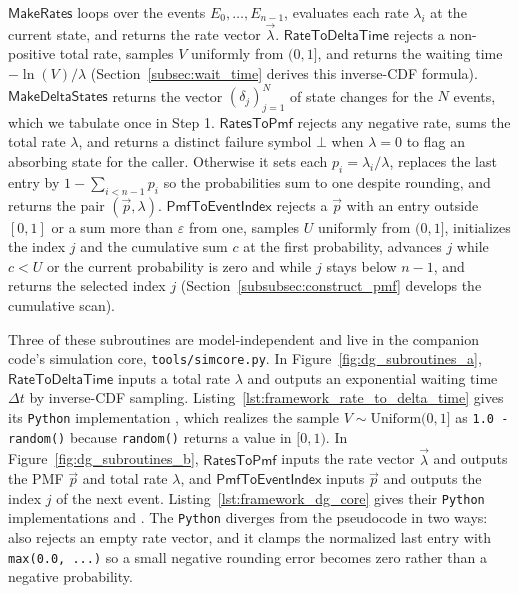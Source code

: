 $\textsf{MakeRates}$ loops over the events $E_0, \ldots, E_{n-1}$, evaluates each rate $\lambda_i$ at the current state, and returns the rate vector $\vec{\lambda}$. $\textsf{RateToDeltaTime}$ rejects a non-positive total rate, samples $V$ uniformly from $(0,1]$, and returns the waiting time $-\ln(V)/\lambda$ (Section~\ref{subsec:wait_time} derives this inverse-CDF formula). $\textsf{MakeDeltaStates}$ returns the vector $(\delta_j)_{j=1}^{N}$ of state changes for the $N$ events, which we tabulate once in Step 1. $\textsf{RatesToPmf}$ rejects any negative rate, sums the total rate $\lambda$, and returns a distinct failure symbol $\bot$ when $\lambda = 0$ to flag an absorbing state for the caller. Otherwise it sets each $p_i = \lambda_i/\lambda$, replaces the last entry by $1 - \sum_{i < n-1} p_i$ so the probabilities sum to one despite rounding, and returns the pair $(\vec{p}, \lambda)$. $\textsf{PmfToEventIndex}$ rejects a $\vec{p}$ with an entry outside $[0,1]$ or a sum more than $\varepsilon$ from one, samples $U$ uniformly from $(0,1]$, initializes the index $j$ and the cumulative sum $c$ at the first probability, advances $j$ while $c < U$ or the current probability is zero and while $j$ stays below $n-1$, and returns the selected index $j$ (Section~\ref{subsubsec:construct_pmf} develops the cumulative scan).

Three of these subroutines are model-independent and live in the companion code's simulation core, \texttt{tools/simcore.py}. In Figure~\ref{fig:dg_subroutines_a}, $\textsf{RateToDeltaTime}$ inputs a total rate $\lambda$ and outputs an exponential waiting time $\Delta t$ by inverse-CDF sampling. Listing~\ref{lst:framework_rate_to_delta_time} gives its \texttt{Python} implementation \RateToDeltaTime{}, which realizes the sample $V \sim \mathrm{Uniform}(0,1]$ as \texttt{1.0 - random()} because \texttt{random()} returns a value in $[0,1)$. In Figure~\ref{fig:dg_subroutines_b}, $\textsf{RatesToPmf}$ inputs the rate vector $\vec{\lambda}$ and outputs the PMF $\vec{p}$ and total rate $\lambda$, and $\textsf{PmfToEventIndex}$ inputs $\vec{p}$ and outputs the index $j$ of the next event. Listing~\ref{lst:framework_dg_core} gives their \texttt{Python} implementations \RatesToPmf{} and \PmfToEventIndex{}. The \texttt{Python} diverges from the pseudocode in two ways: \RatesToPmf{} also rejects an empty rate vector, and it clamps the normalized last entry with \texttt{max(0.0, ...)} so a small negative rounding error becomes zero rather than a negative probability.



